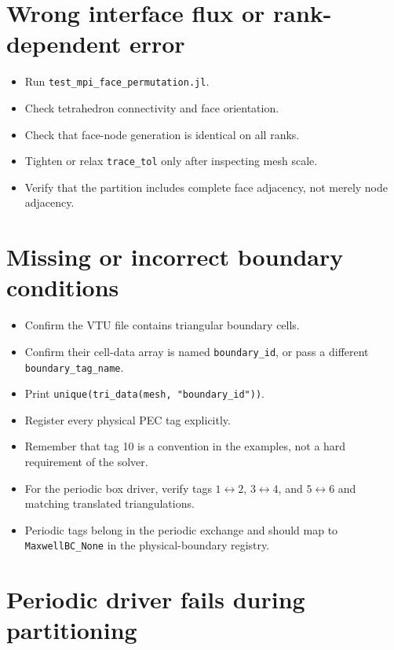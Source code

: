 \documentclass[11pt,oneside]{book}
\newcommand{\code}[1]{\texttt{#1}}
\begin{document}
\section{Wrong interface flux or rank-dependent error}

\begin{itemize}[leftmargin=*]
  \item Run \code{test\_mpi\_face\_permutation.jl}.
  \item Check tetrahedron connectivity and face orientation.
  \item Check that face-node generation is identical on all ranks.
  \item Tighten or relax \code{trace\_tol} only after inspecting mesh scale.
  \item Verify that the partition includes complete face adjacency, not merely
        node adjacency.
\end{itemize}

\section{Missing or incorrect boundary conditions}

\begin{itemize}[leftmargin=*]
  \item Confirm the VTU file contains triangular boundary cells.
  \item Confirm their cell-data array is named \code{boundary\_id}, or pass a
        different \code{boundary\_tag\_name}.
  \item Print \code{unique(tri\_data(mesh, "boundary\_id"))}.
  \item Register every physical PEC tag explicitly.
  \item Remember that tag 10 is a convention in the examples, not a hard
        requirement of the solver.
  \item For the periodic box driver, verify tags $1\leftrightarrow2$,
        $3\leftrightarrow4$, and $5\leftrightarrow6$ and matching translated
        triangulations.
  \item Periodic tags belong in the periodic exchange and should map to
        \code{MaxwellBC\_None} in the physical-boundary registry.
\end{itemize}

\section{Periodic driver fails during partitioning}
\end{document}
